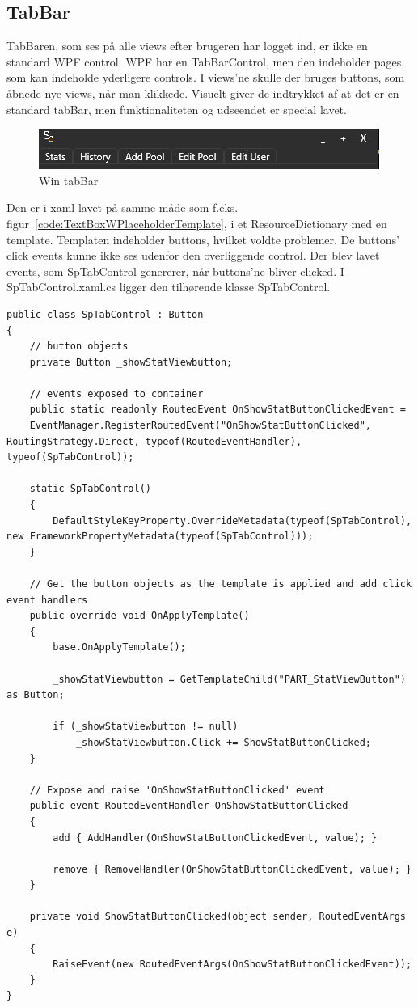 \subsection{TabBar}
TabBaren, som ses på alle views efter brugeren har logget ind, er ikke en standard WPF control. WPF har en TabBarControl, men den indeholder pages, som kan indeholde yderligere controls. I views'ne skulle der bruges buttons, som åbnede nye views, når man klikkede. Visuelt giver de indtrykket af at det er en standard tabBar, men funktionaliteten og udseendet er special lavet.
\begin{figure}
\centering
\includegraphics[width=0.7\linewidth]{figs/implementering/tabbar}
\caption{Win tabBar}
\label{fig:tabbar}
\end{figure}
Den er i xaml lavet på samme måde som f.eks. figur~\ref{code:TextBoxWPlaceholderTemplate}, i et ResourceDictionary med en template. 
Templaten indeholder buttons, hvilket voldte problemer. De buttons' click events kunne ikke ses udenfor den overliggende control. Der blev lavet events, som SpTabControl genererer, når buttons'ne bliver clicked.
I SpTabControl.xaml.cs ligger den tilhørende klasse SpTabControl.
\begin{lstlisting}[caption=SpTabControl, label=SpTabControl]
public class SpTabControl : Button
{
	// button objects
	private Button _showStatViewbutton;
	
	// events exposed to container
	public static readonly RoutedEvent OnShowStatButtonClickedEvent =
	EventManager.RegisterRoutedEvent("OnShowStatButtonClicked", RoutingStrategy.Direct, typeof(RoutedEventHandler), typeof(SpTabControl));
	
	static SpTabControl()
	{
		DefaultStyleKeyProperty.OverrideMetadata(typeof(SpTabControl), new FrameworkPropertyMetadata(typeof(SpTabControl)));
	}
	
	// Get the button objects as the template is applied and add click event handlers
	public override void OnApplyTemplate()
	{
		base.OnApplyTemplate();
		
		_showStatViewbutton = GetTemplateChild("PART_StatViewButton") as Button;
		
		if (_showStatViewbutton != null)
			_showStatViewbutton.Click += ShowStatButtonClicked;
	}
	
	// Expose and raise 'OnShowStatButtonClicked' event
	public event RoutedEventHandler OnShowStatButtonClicked
	{
		add { AddHandler(OnShowStatButtonClickedEvent, value); }
	
		remove { RemoveHandler(OnShowStatButtonClickedEvent, value); }
	}
	
	private void ShowStatButtonClicked(object sender, RoutedEventArgs e)
	{
		RaiseEvent(new RoutedEventArgs(OnShowStatButtonClickedEvent));
	}
}
\end{lstlisting}

